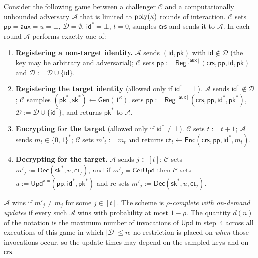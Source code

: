 \documentclass{aicr-conjecture}
\newcommand{\Gen}{\mathsf{Gen}}
\newcommand{\Reg}{\mathsf{Reg}}
\newcommand{\Enc}{\mathsf{Enc}}
\newcommand{\Upd}{\mathsf{Upd}}
\newcommand{\Dec}{\mathsf{Dec}}
\newcommand{\pp}{\mathsf{pp}}
\newcommand{\aux}{\mathsf{aux}}
\newcommand{\crs}{\mathsf{crs}}
\newcommand{\pk}{\mathsf{pk}}
\newcommand{\sk}{\mathsf{sk}}
\newcommand{\id}{\mathsf{id}}
\newcommand{\ct}{\mathsf{ct}}
\newcommand{\GetUpd}{\mathsf{GetUpd}}
\begin{document}
\begin{definition}\label{def:comp}
Consider the following game between a challenger $\mathcal{C}$ and a
computationally unbounded adversary $\mathcal{A}$ that is limited to
$\mathrm{poly}(\kappa)$ rounds of interaction. $\mathcal{C}$ sets
$\pp = \aux = u = \bot$, $\mathcal{D} = \emptyset$, $\id^{*} = \bot$,
$t = 0$, samples $\crs$ and sends it to $\mathcal{A}$. In each round
$\mathcal{A}$ performs exactly one of:
\begin{enumerate}
  \item \textbf{Registering a non-target identity.} $\mathcal{A}$ sends
    $(\id,\pk)$ with $\id \notin \mathcal{D}$ (the key may be arbitrary
    and adversarial); $\mathcal{C}$ sets
    $\pp := \Reg^{[\aux]}(\crs,\pp,\id,\pk)$ and
    $\mathcal{D} := \mathcal{D} \cup \{\id\}$.
  \item \textbf{Registering the target identity} (allowed only if
    $\id^{*} = \bot$). $\mathcal{A}$ sends $\id^{*} \notin \mathcal{D}$;
    $\mathcal{C}$ samples $(\pk^{*},\sk^{*}) \leftarrow
    \Gen(1^{\kappa})$, sets
    $\pp := \Reg^{[\aux]}(\crs,\pp,\id^{*},\pk^{*})$,
    $\mathcal{D} := \mathcal{D} \cup \{\id^{*}\}$, and returns $\pk^{*}$
    to $\mathcal{A}$.
  \item \textbf{Encrypting for the target} (allowed only if
    $\id^{*} \neq \bot$). $\mathcal{C}$ sets $t := t+1$; $\mathcal{A}$
    sends $m_t \in \{0,1\}^{*}$; $\mathcal{C}$ sets $m'_t := m_t$ and
    returns $\ct_t \leftarrow \Enc(\crs,\pp,\id^{*},m_t)$.
  \item \textbf{Decrypting for the target.} $\mathcal{A}$ sends
    $j \in [t]$; $\mathcal{C}$ sets
    $m'_j := \Dec(\sk^{*},u,\ct_j)$, and if $m'_j = \GetUpd$ then
    $\mathcal{C}$ sets $u := \Upd^{\aux}(\pp,\id^{*},\pk^{*})$ and
    re-sets $m'_j := \Dec(\sk^{*},u,\ct_j)$.
\end{enumerate}
$\mathcal{A}$ wins if $m'_j \neq m_j$ for some $j \in [t]$. The scheme
is \emph{$\rho$-complete with on-demand updates} if every such
$\mathcal{A}$ wins with probability at most $1-\rho$. The quantity
$d(n)$ of the notation is the maximum number of invocations of $\Upd$ in
step~4 across all executions of this game in which
$|\mathcal{D}| \le n$; no restriction is placed on \emph{when} those
invocations occur, so the update times may depend on the sampled keys
and on $\crs$.
\end{definition}
\end{document}
